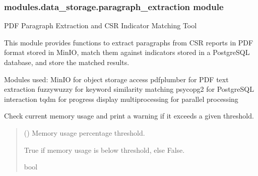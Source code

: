 \documentclass[letterpaper,10pt,english]{sphinxmanual}
\begin{document}
\subsubsection{modules.data\_storage.paragraph\_extraction module}
\label{\detokenize{modules.data_storage:module-modules.data_storage.paragraph_extraction}}\label{\detokenize{modules.data_storage:modules-data-storage-paragraph-extraction-module}}
\sphinxAtStartPar
PDF Paragraph Extraction and CSR Indicator Matching Tool

\sphinxAtStartPar
This module provides functions to extract paragraphs from CSR reports in PDF format stored in MinIO,
match them against indicators stored in a PostgreSQL database, and store the matched results.

\sphinxAtStartPar
Modules used:
\sphinxhyphen{} MinIO for object storage access
\sphinxhyphen{} pdfplumber for PDF text extraction
\sphinxhyphen{} fuzzywuzzy for keyword similarity matching
\sphinxhyphen{} psycopg2 for PostgreSQL interaction
\sphinxhyphen{} tqdm for progress display
\sphinxhyphen{} multiprocessing for parallel processing

\begin{fulllineitems}
\label{\detokenize{modules.data_storage:modules.data_storage.paragraph_extraction.check_memory_usage}}
\pysigstartsignatures
\pysiglinewithargsret
{}
{}
{}
\pysigstopsignatures
\sphinxAtStartPar
Check current memory usage and print a warning if it exceeds a given threshold.
\begin{quote}\begin{description}
\sphinxAtStartPar
{} () \textendash{} Memory usage percentage threshold.

\sphinxAtStartPar
True if memory usage is below threshold, else False.

\sphinxAtStartPar
bool

\end{description}\end{quote}

\end{fulllineitems}
\end{document}
